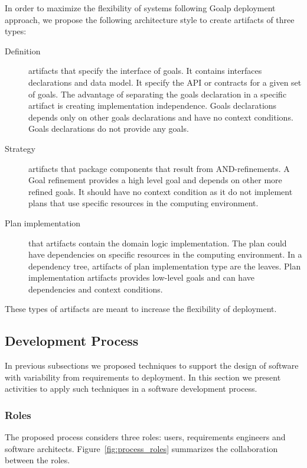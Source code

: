 In order to maximize the flexibility of systems following Goalp deployment approach, we propose the following architecture style to create artifacts of three types:

\begin{description}
  \item[Definition] artifacts that specify the interface of goals. It contains interfaces declarations and data model. It specify the API or contracts for a given set of goals.
  The advantage of separating the goals declaration in a specific artifact is creating implementation independence.
  Goals declarations depends only on other goals declarations and have no context conditions. Goals declarations do not provide any goals.

  \item[Strategy] artifacts that package components that result from AND-refinements. A Goal refinement provides a high level goal and depends on other more refined goals. It should have no context condition as it do not implement plans that use specific resources in the computing environment.

  \item[Plan implementation] that artifacts contain the domain logic implementation. The plan could have dependencies on specific resources in the computing environment.
  In a dependency tree, artifacts of plan implementation type are the leaves.
  Plan implementation artifacts provides low-level goals and can have dependencies and context conditions.

\end{description}

These types of artifacts are meant to increase the flexibility of deployment.


\subsection{Development Process}

In previous subsections we proposed techniques to support the design of software with variability from requirements to deployment. In this section we present activities to apply such techniques in a software development process.

\subsubsection{Roles}
The proposed process considers three roles: users, requirements engineers and software architects.
Figure~\ref{fig:process_roles} summarizes the collaboration between the roles.

